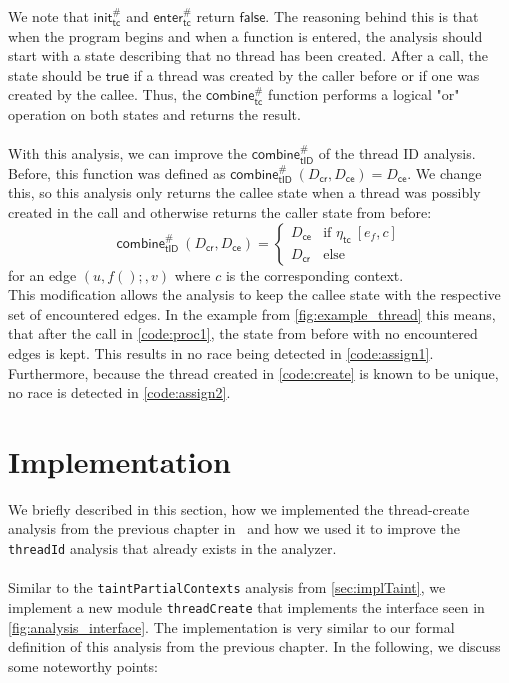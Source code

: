   We note that $\textsf{init}^{\#}_\textsf{tc}$ and $\textsf{enter}^{\#}_\textsf{tc}$ return $\textsf{false}$. The reasoning behind this is that when the program begins and when a function is entered, the analysis should start with a state describing that no thread has been created. After a call, the state should be $\textsf{true}$ if a thread was created by the caller before or if one was created by the callee. Thus, the $\textsf{combine}^{\#}_\textsf{tc}$ function performs a logical "or" operation on both states and returns the result.\\
  \\
  With this analysis, we can improve the $\textsf{combine}^{\#}_\textsf{tID}$ of the thread ID analysis. Before, this function was defined as $\textsf{combine}^{\#}_\textsf{tID}\ (D_\textsf{cr}, D_\textsf{ce}) = D_\textsf{ce}$. We change this, so this analysis only returns the callee state when a thread was possibly created in the call and otherwise returns the caller state from before:
  \[\textsf{combine}^{\#}_\textsf{tID}\ (D_\textsf{cr}, D_\textsf{ce}) = \left\{ \begin{array}{ll}
    D_\textsf{ce} & \text{if } \eta_\textsf{tc}\ [e_f,c]\\
    D_\textsf{cr} & \text{else}
  \end{array} \right.\]
  for an edge $(u, f();, v)$ where $c$ is the corresponding context.\\
  This modification allows the analysis to keep the callee state with the respective set of encountered edges. In the example from \autoref{fig:example_thread} this means, that after the call in \autoref{code:proc1}, the state from before with no encountered edges is kept. This results in no race being detected in \autoref{code:assign1}. Furthermore, because the thread created in \autoref{code:create} is known to be unique, no race is detected in \autoref{code:assign2}.

  \section{Implementation}
    We briefly described in this section, how we implemented the thread-create analysis from the previous chapter in \gob\ and how we used it to improve the \texttt{threadId} analysis that already exists in the analyzer.\\
    \\
    Similar to the \texttt{taintPartialContexts} analysis from \autoref{sec:implTaint}, we implement a new module \texttt{threadCreate} that implements the interface seen in \autoref{fig:analysis_interface}. The implementation is very similar to our formal definition of this analysis from the previous chapter. In the following, we discuss some noteworthy points:\\

